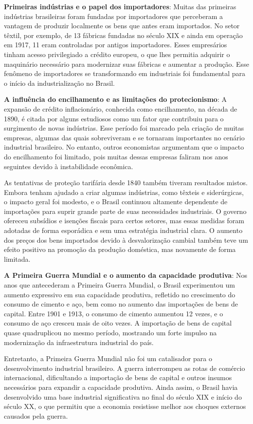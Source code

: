 \documentclass[a4paper,12pt]{article}[abntex2]
\begin{document}
\textbf{Primeiras indústrias e o papel dos importadores}: Muitas das primeiras indústrias brasileiras foram fundadas por importadores que perceberam a vantagem de produzir localmente os bens que antes eram importados. No setor têxtil, por exemplo, de 13 fábricas fundadas no século XIX e ainda em operação em 1917, 11 eram controladas por antigos importadores. Esses empresários tinham acesso privilegiado a crédito europeu, o que lhes permitia adquirir o maquinário necessário para modernizar suas fábricas e aumentar a produção. Esse fenômeno de importadores se transformando em industriais foi fundamental para o início da industrialização no Brasil.

\textbf{A influência do encilhamento e as limitações do protecionismo}: A expansão de crédito inflacionário, conhecida como encilhamento, na década de 1890, é citada por alguns estudiosos como um fator que contribuiu para o surgimento de novas indústrias. Esse período foi marcado pela criação de muitas empresas, algumas das quais sobreviveram e se tornaram importantes no cenário industrial brasileiro. No entanto, outros economistas argumentam que o impacto do encilhamento foi limitado, pois muitas dessas empresas faliram nos anos seguintes devido à instabilidade econômica.

As tentativas de proteção tarifária desde 1840 também tiveram resultados mistos. Embora tenham ajudado a criar algumas indústrias, como têxteis e siderúrgicas, o impacto geral foi modesto, e o Brasil continuou altamente dependente de importações para suprir grande parte de suas necessidades industriais. O governo ofereceu subsídios e isenções fiscais para certos setores, mas essas medidas foram adotadas de forma esporádica e sem uma estratégia industrial clara. O aumento dos preços dos bens importados devido à desvalorização cambial também teve um efeito positivo na promoção da produção doméstica, mas novamente de forma limitada.

\textbf{A Primeira Guerra Mundial e o aumento da capacidade produtiva}: Nos anos que antecederam a Primeira Guerra Mundial, o Brasil experimentou um aumento expressivo em sua capacidade produtiva, refletido no crescimento do consumo de cimento e aço, bem como no aumento das importações de bens de capital. Entre 1901 e 1913, o consumo de cimento aumentou 12 vezes, e o consumo de aço cresceu mais de oito vezes. A importação de bens de capital quase quadruplicou no mesmo período, mostrando um forte impulso na modernização da infraestrutura industrial do país.

Entretanto, a Primeira Guerra Mundial não foi um catalisador para o desenvolvimento industrial brasileiro. A guerra interrompeu as rotas de comércio internacional, dificultando a importação de bens de capital e outros insumos necessários para expandir a capacidade produtiva. Ainda assim, o Brasil havia desenvolvido uma base industrial significativa no final do século XIX e início do século XX, o que permitiu que a economia resistisse melhor aos choques externos causados pela guerra.
\end{document}
